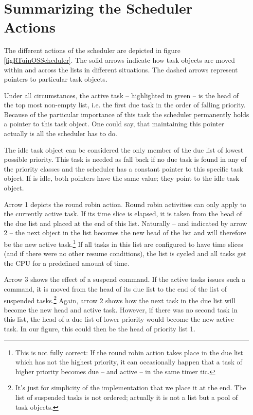 \section{Summarizing the Scheduler Actions}


The different actions of the scheduler are depicted in figure
\ref{figRTuinOSScheduler}. The solid arrows indicate how task objects are
moved within and across the lists in different situations. The dashed
arrows represent pointers to particular task objects.

Under all circumstances, the active task -- highlighted in green -- is the
head of the top most non-empty list, i.e. the first due task in the order
of falling priority. Because of the particular importance of this task the
scheduler permanently holds a pointer to this task object. One could say,
that maintaining this pointer actually is all the scheduler has to do.

The idle task object can be considered the only member of the due list of
lowest possible priority. This task is needed as fall back if no due task
is found in any of the priority classes and the scheduler has a constant
pointer to this specific task object. If \rtos{} is idle, both pointers have
the same value; they point to the idle task object.

Arrow 1 depicts the round robin action. Round robin activities can only
apply to the currently active task. If its time slice is elapsed, it is
taken from the head of the due list and placed at the end of this list.
Naturally -- and indicated by arrow 2 -- the next object in the list
becomes the new head of the list and will therefore be the new active
task.\footnote{This is not fully correct: If the round robin action takes
place in the due list which has not the highest priority, it can
occasionally happen that a task of higher priority becomes due -- and
active -- in the same timer tic.} If all tasks in this list are configured
to have time slices (and if there were no other resume conditions), the
list is cycled and all tasks get the CPU for a predefined amount of time.

Arrow 3 shows the effect of a suspend command. If the active tasks issues
such a command, it is moved from the head of its due list to the end of
the list of suspended tasks.\footnote{It's just for simplicity of the
implementation that we place it at the end. The list of suspended tasks is
not ordered; actually it is not a list but a pool of task objects.} Again,
arrow 2 shows how the next task in the due list will become the new head
and active task. However, if there was no second task in this list, the
head of a due list of lower priority would become the new active task. In
our figure, this could then be the head of priority list 1.

